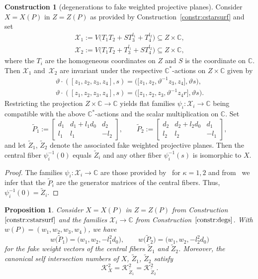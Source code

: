 \documentclass[pdftex]{sigma}
\newtheorem{prop}[thm]{Proposition}
\theoremstyle{definition}
\newtheorem{constr}[thm]{Construction}
\def\CC{{\mathbb C}}
\begin{document}
\begin{constr}[degenerations to fake weighted projective planes]
\label{constr:degs}
Consider $X=X(P)$ in $Z=Z(P)$ as provided by
Construction~\ref{constr:cstarsurf}
and set
\begin{gather*}
\mathcal{X}_1
 :=
V\bigl(T_1T_2 + ST_3^{l_1} + T_4^{l_2}\bigr)
 \subseteq
Z \times \CC,
\\
\mathcal{X}_2
 :=
V\bigl(T_1T_2 + T_3^{l_1} + ST_4^{l_2}\bigr)
 \subseteq
Z \times \CC,
\end{gather*}
where the $T_i$ are the homogeneous coordinates
on $Z$ and $S$ is the coordinate on $\CC$.
Then $\mathcal{X}_1$ and~$\mathcal{X}_2$
are invariant under the respective $\CC^*$-actions
on $Z \times \CC$ given by
\begin{gather*}
\vartheta \cdot ([z_1,z_2,z_3,z_4],s)
 =
\bigl(\bigl[z_1,z_2,\vartheta^{-1}z_3,z_4\bigr],\vartheta s\bigr),
\\
\vartheta \cdot ([z_1,z_2,z_3,z_4],s)
 =
\bigl(\bigl[z_1,z_2,z_3,\vartheta^{-1}z_4r],\vartheta s\bigr).
\end{gather*}
Restricting the projection $Z \times \CC \to \CC$
yields flat families
$\psi_i \colon \mathcal{X}_i \to \CC$
being compatible with the above $\CC^*$-actions
and the scalar multiplication on $\CC$.
Set
\[
\tilde P_1
 :=
\begin{bmatrix}
d_1 & d_1+l_1d_0 & d_2
\\
l_1 & l_1 & -l_2
\end{bmatrix},
\qquad
\tilde P_2
 :=
\begin{bmatrix}
d_2 & d_2+l_2d_0 & d_1
\\
l_2 & l_2 & -l_1
\end{bmatrix},
\]
and let $\tilde Z_1$, $\tilde Z_2$ denote
the associated fake weighted projective planes.
Then the central fiber $\psi_i^{-1}(0)$
equals $\tilde Z_i$ and any other fiber
$\psi_i^{-1}(s)$ is isomorphic to $X$.
\end{constr}


\begin{proof}
The families $\psi_i \colon \mathcal{X}_i \to \CC$
are those provided by~\cite[Construction~4.1]{HaHaSu}
for $\kappa = 1,2$
and from~\cite[Proposition~4.6]{HaHaSu} we infer that
the $\tilde P_i$ are the generator matrices of
the central fibers.
Thus, $\psi_i^{-1}(0) = \tilde Z_i$.
\end{proof}

\begin{prop}
\label{prop:degprops}
Consider $X=X(P)$ in $Z=Z(P)$ from
Construction~$\ref{constr:cstarsurf}$
and the families $\mathcal{X}_i \to \CC$
from Construction~$\ref{constr:degs}$.
With $w(P) = (w_1,w_2,w_3,w_4)$,
we have
\[
w\bigl(\tilde P_1\bigr)
 =
\bigl(w_1, w_2, -l_1^2d_0\bigr),
\qquad
w\bigl(\tilde P_2\bigr)
 =
\bigl(w_1, w_2, -l_2^2d_0\bigr)
\]
for the fake weight vectors of the central
fibers $\tilde Z_1$ and $\tilde Z_2$.
Moreover, the canonical self intersection
numbers of $X$, $\tilde Z_1$, $\tilde Z_2$ satisfy
\[
\mathcal{K}_X^2
 =
\mathcal{K}_{\tilde Z_1}^2
 =
\mathcal{K}_{\tilde Z_2}^2.
\]
\end{prop}
\end{document}
